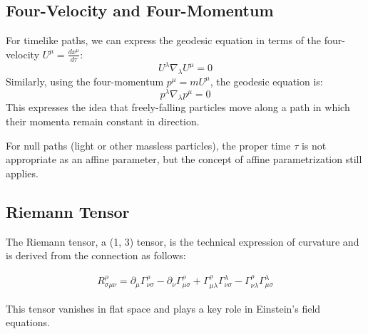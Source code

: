 \documentclass[12pt]{book}
\begin{document}
\subsection{Four-Velocity and Four-Momentum}

For timelike paths, we can express the geodesic equation in terms of the four-velocity \( U^\mu = \frac{dx^\mu}{d\tau} \):
\[
U^\lambda \nabla_\lambda U^\mu = 0
\]
Similarly, using the four-momentum \( p^\mu = m U^\mu \), the geodesic equation is:
\[
p^\lambda \nabla_\lambda p^\mu = 0
\]
This expresses the idea that freely-falling particles move along a path in which their momenta remain constant in direction.

For null paths (light or other massless particles), the proper time \( \tau \) is not appropriate as an affine parameter, but the concept of affine parametrization still applies.







\subsection{Riemann Tensor}
The Riemann tensor, a (1, 3) tensor, is the technical expression of curvature and is derived from the connection as follows:

\begin{align}
R^\rho_{\sigma\mu\nu} = \partial_\mu \Gamma^\rho_{\nu\sigma} - \partial_\nu \Gamma^\rho_{\mu\sigma} + \Gamma^\rho_{\mu\lambda} \Gamma^\lambda_{\nu\sigma} - \Gamma^\rho_{\nu\lambda} \Gamma^\lambda_{\mu\sigma}
\end{align}

This tensor vanishes in flat space and plays a key role in Einstein's field equations.
\end{document}
